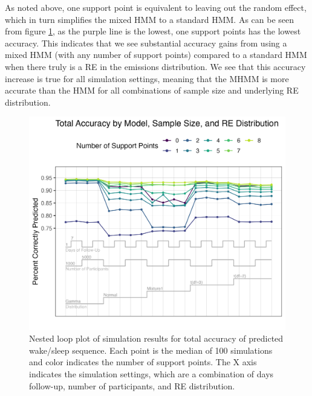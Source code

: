 \documentclass{article}
\begin{document}
As noted above, one support point is equivalent to leaving out the 
random effect, which in turn simplifies the mixed HMM to a standard HMM. 
As can be seen from figure \ref{NLacc}, as the purple line is the lowest, 
one support points has the lowest accuracy. This indicates that we see 
substantial accuracy gains from using a mixed HMM  (with any number 
of support points) compared to a standard HMM when there truly is a 
RE in the emissions distribution. We see that this accuracy increase 
is true for all simulation settings, meaning that the MHMM is more 
accurate than the HMM for all combinations of sample size and underlying RE distribution.

\begin{figure}
\includegraphics[scale=.8]{Support/NestedLoopAcc.png}
\centering
\caption{Nested loop plot of simulation results for total accuracy of predicted wake/sleep sequence. Each point is the median of 100 simulations and color indicates the number of support points. The X axis indicates the simulation settings, which are a combination of days follow-up, number of participants, and RE distribution.}
\label{NLacc}
\end{figure}
\end{document}
